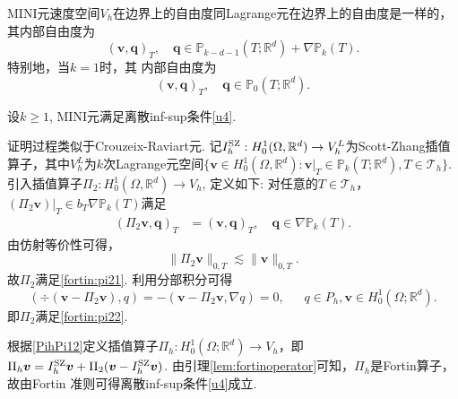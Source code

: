 MINI元速度空间$V_h$在边界上的自由度同Lagrange元在边界上的自由度是一样的，其内部自由度为
\begin{equation*}
(\boldsymbol{v}, \boldsymbol{q})_T, \quad \boldsymbol{q}\in\mathbb P_{k-d-1}(T;\mathbb{R}^{d})+\nabla\mathbb P_k(T).
\end{equation*}
特别地，当$k=1$时，其
内部自由度为
\begin{equation*}
(\boldsymbol{v}, \boldsymbol{q})_T, \quad \boldsymbol{q}\in\mathbb P_{0}(T;\mathbb{R}^{d}).
\end{equation*}

\begin{lemma}
设$k\geq1$, MINI元满足离散inf-sup条件\eqref{u4}.
\end{lemma}
\begin{prf}
证明过程类似于Crouzeix-Raviart元.
记$I_h^{\rm SZ}: H_{0}^{1}(\Omega,\mathbb{R}^{d})\to V_{h}^L$为Scott-Zhang插值算子\cite{ScottZhang1990}，其中$V_{h}^L$为$k$次Lagrange元空间$\{\boldsymbol{v}\in H_{0}^{1}(\Omega,\mathbb{R}^{d}): \boldsymbol{v}|_T\in \mathbb P_k(T;\mathbb R^d), T\in \mathcal{T}_h\}$.
引入插值算子$\Pi_2: H_{0}^{1}(\Omega,\mathbb{R}^{d})\to V_{h}$, 定义如下: 对任意的$T\in\mathcal{T}_h$， $(\Pi_2\boldsymbol{v})|_T\in b_T\nabla\mathbb P_{k}(T)$满足
\begin{align*}
(\Pi_2\boldsymbol{v}, \boldsymbol{q})_T&=(\boldsymbol{v}, \boldsymbol{q})_T, \quad \boldsymbol{q}\in\nabla\mathbb P_{k}(T).
\end{align*}
由仿射等价性可得，
\begin{equation*}
\|\Pi_{2}\boldsymbol{v}\|_{0,T}\lesssim  \|\boldsymbol{v}\|_{0,T}.
\end{equation*}
故$\Pi_2$满足\eqref{fortin:pi21}.
利用分部积分可得
\begin{equation*}
(\div(\boldsymbol{v}-\Pi_2\boldsymbol{v}),q)=-(\boldsymbol{v}-\Pi_2\boldsymbol{v},\nabla q)=0,
\quad\;\; q\in P_{h}, \boldsymbol{v}\in H_0^{1}(\Omega; \mathbb{R}^{d}).
\end{equation*}
即$\Pi_2$满足\eqref{fortin:pi22}.

根据\eqref{PihPi12}定义插值算子$\Pi_{h}: H_0^{1}(\Omega; \mathbb{R}^{d})\rightarrow  V_{h}$，即
$\Pi_{h}\boldsymbol{v}=I_h^{\rm SZ}\boldsymbol{v}
+\Pi_{2}(\boldsymbol{v}-I_h^{\rm SZ}\boldsymbol{v})$. 由引理\ref{lem:fortinoperator}可知，$\Pi_{h}$是Fortin算子，故由Fortin 准则可得离散inf-sup条件\eqref{u4}成立.
\end{prf}

